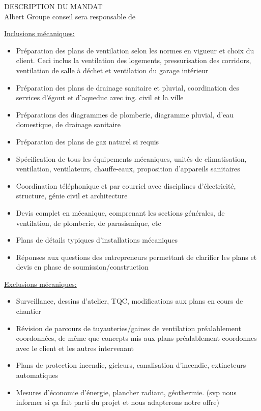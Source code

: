 DESCRIPTION DU MANDAT\\ Albert Groupe conseil sera responsable de\par\underline{Inclusions mécaniques:}\begin{itemize} \item[\textbullet] Préparation des plans de ventilation selon les normes en vigueur et choix du client. Ceci inclus la ventilation des logements, pressurisation des corridors, ventilation de salle à déchet et ventilation du garage intérieur\item[\textbullet] Préparation des plans de drainage sanitaire et pluvial, coordination des services d'égout et d'aqueduc avec ing. civil et la ville\item[\textbullet] Préparations des diagrammes de plomberie, diagramme pluvial, d’eau domestique, de drainage sanitaire\item[\textbullet] Préparation des plans de gaz naturel si requis\item[\textbullet] Spécification de tous les équipements mécaniques, unités de climatisation, ventilation, ventilateurs, chauffe-eaux, proposition d'appareils sanitaires\item[\textbullet] Coordination téléphonique et par courriel avec disciplines d'électricité, structure, génie civil et architecture\item[\textbullet] Devis complet en mécanique, comprenant les sections générales, de ventilation, de plomberie, de parasismique, etc\item[\textbullet] Plans de détails typiques d’installations mécaniques\item[\textbullet] Réponses aux questions des entrepreneurs permettant de clarifier les plans et devis en phase de soumission/construction\end{itemize}\par\underline{Exclusions mécaniques:}\begin{itemize} \item[\textbullet] Surveillance, dessins d'atelier, TQC, modifications aux plans en cours de chantier\item[\textbullet] Révision de parcours de tuyauteries/gaines de ventilation préalablement coordonnées, de même que concepts mis aux plans préalablement coordonnes avec le client et les autres intervenant\item[\textbullet] Plans de protection incendie, gicleurs, canalisation d’incendie, extincteurs automatiques\item[\textbullet] Mesures d’économie d’énergie, plancher radiant, géothermie. (svp nous informer si ça fait parti du projet et nous adapterons notre offre)\end{itemize}